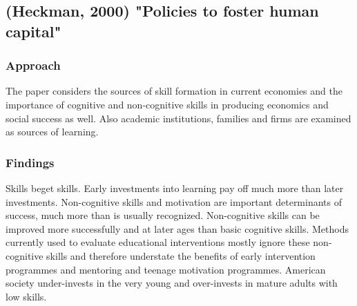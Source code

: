 \documentclass[12pt,a4paper]{article}
\begin{document}
    \subsection{(Heckman, 2000) "Policies to foster human capital"}
      \subsubsection{Approach}
        The paper considers the sources of skill formation in current economies and the importance of cognitive and non-cognitive skills in producing economics and social success as well. Also academic institutions, families and firms are examined as sources of learning.
      \subsubsection{Findings}
        Skills beget skills. Early investments into learning pay off much more than later investments. Non-cognitive skills and motivation are important determinants of success, much more than is usually recognized. Non-cognitive skills can be improved more successfully and at later ages than basic cognitive skills. Methods currently used to evaluate educational interventions mostly ignore these non-cognitive skills and therefore understate the benefits of early intervention programmes and mentoring and teenage motivation programmes. American society under-invests in the very young and over-invests in mature adults with low skills.
\end{document}
